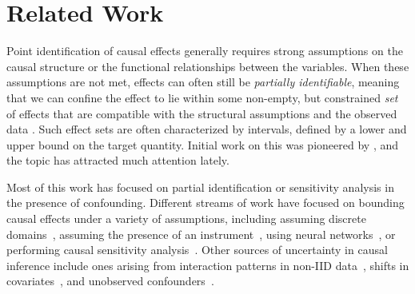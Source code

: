 \section{Related Work}
\label{sec:rel-work}

Point identification of causal effects generally requires strong assumptions on the causal structure or the functional relationships between the variables. When these assumptions are not met, effects can often still be \emph{partially identifiable}, meaning that we can confine the effect to lie within some non-empty, but constrained \emph{set} of effects that are compatible with the structural assumptions and the observed data \citep{manski1990nonparametric}. Such effect sets are often characterized by intervals, defined by a lower and upper bound on the target quantity. Initial work on this was pioneered by \citet{Balke1997,chickering96}, and the topic has attracted much attention lately. 

Most of this work has focused on partial identification or sensitivity analysis in the presence of confounding. Different streams of work have focused on bounding causal effects under a variety of assumptions, including assuming discrete domains~\citep{zhang2021bounding, duarte2023automated,raichev2024estimating}, assuming the presence of an instrument~\citep{gunsilius2019path, kilbertus2020class}, using neural networks~\citep{hu2021generative, padh2023stochastic}, or performing causal sensitivity analysis~\citep{frauen2024sharp, melnychuk2024partial, jesson2021quantifying, marmarelis2023partial}.
Other sources of uncertainty in causal inference include ones arising from interaction patterns in non-IID data~\citep{zhang2022causalinferenceuncertainty,bhattacharya2020causal}, shifts in covariates~\citep{Jesson2020identifying}, and unobserved confounders~\citep{Tchetgen2013control}.


